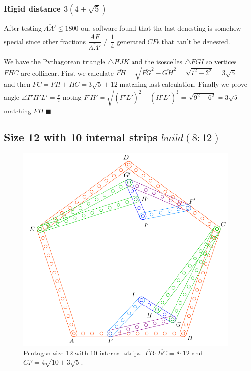 \documentclass[11pt]{article}
\begin{document}
\subsubsection{Rigid distance $3(4 + \sqrt5)$}

After testing $\overline{AA'} \le 1800$ our software found that the last denesting is somehow special since other fractions $\dfrac{\overline{AF}}{\overline{AA'}} \neq \dfrac{1}4$ generated $\overline{CF}$s that can't be denested.

We have the Pythagorean triangle $\triangle{HJK}$ and the isoscelles $\triangle{FGI}$ so vertices $FHC$ are collinear. First we calculate $\overline{FH} = \sqrt{\overline{FG}^2 - \overline{GH}^2} = \sqrt{7^2 - 2^2} = 3\sqrt5$ and then $\overline{FC} = \overline{FH} + \overline{HC} = 3\sqrt{5} + 12$ matching last calculation. Finally we prove angle $\angle{F'H'L'} = \frac{\pi}2$ noting $\overline{F'H'} = \sqrt{(\overline{F'L'})^2 - (\overline{H'L'})^2} = \sqrt{9^2 - 6^2} = 3\sqrt5$ matching $\overline{FH}$ $\blacksquare$.

\subsection{Size 12 with 10 internal strips $build(8:12)$}

\begin{figure}[H]
 \centering
 \includegraphics[scale=0.80]{12/penta12-10b}
 \caption{Pentagon size 12 with 10 internal strips.  $\overline{FB}:\overline{BC} = 8:12$ and $\overline{CF} = 4\sqrt{10 + 3\sqrt5}$.}
 \label{fig:penta12-10b}
\end{figure}
\end{document}
